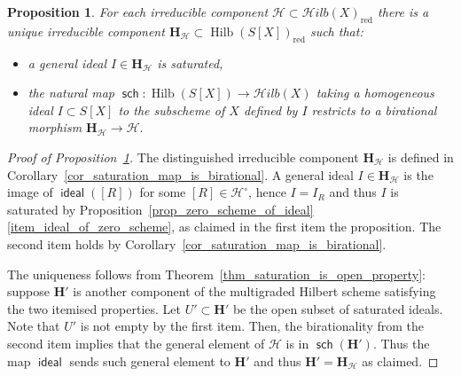\documentclass[10pt,a4paper]{amsart}
\newtheorem{prop}{Proposition}
\DeclareMathOperator{\Hilb}{Hilb}
\newcommand{\ccH}{{\mathcal{H}}}
\DeclareMathOperator{\idealmap}{\mathsf {ideal}}
\newcommand{\reduced}[1]{{#1}_{\operatorname{red}}}
\DeclareMathOperator{\sch}{\mathsf {sch}}
\newcommand{\usualHilb}{{\ccH}ilb}
\begin{document}
\begin{prop}\label{prop_distinguished_components}
   For each irreducible component
      $\ccH\subset \reduced{\usualHilb(X)}$
      there is a unique irreducible component $\mathbf{H}_{\ccH} \subset \reduced{\Hilb(S[X])}$ such that:
      \begin{itemize}
       \item a general ideal $I\in \mathbf{H}_{\ccH}$ is saturated,
       \item the natural map $\sch\colon\Hilb(S[X]) \to \usualHilb(X)$
             taking a homogeneous ideal $I\subset S[X]$
             to the subscheme of $X$ defined by $I$
             restricts to a birational morphism
              $\mathbf{H}_{\ccH}\to \ccH.$
      \end{itemize}
\end{prop}

\begin{proof}[Proof of Proposition~\ref{prop_distinguished_components}]
   The distinguished irreducible
   component $\mathbf{H}_{\ccH}$
   is defined in Corollary~\ref{cor_saturation_map_is_birational}.
   A general ideal $I\in \mathbf{H}_{\ccH}$
     is the image of $\idealmap([R])$ for some
     $[R]\in \ccH^{\circ}$, hence $I=I_R$ and thus $I$ is saturated by Proposition~\ref{prop_zero_scheme_of_ideal}\ref{item_ideal_of_zero_scheme}, as claimed in the first item the proposition.
   The second item holds by Corollary~\ref{cor_saturation_map_is_birational}.

   The uniqueness follows from Theorem~\ref{thm_saturation_is_open_property}:    suppose $\mathbf{H}'$ is another component of the multigraded
      Hilbert scheme satisfying the two itemised properties.
   Let $U' \subset \mathbf{H}'$ be the open subset of saturated ideals.
   Note that $U'$ is not empty by the first item.
   Then, the birationality from the second item implies
      that the general element of $\ccH$ is in $\sch(\mathbf{H}')$.
   Thus the map $\idealmap$ sends such general element to
      $\mathbf{H}'$ and thus $\mathbf{H}'=\mathbf{H}_{\ccH}$ as claimed.
\end{proof}
\end{document}

